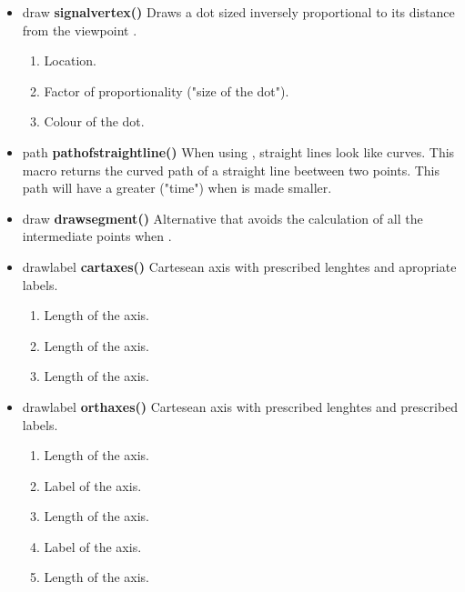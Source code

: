 \begin{itemize}
\item draw {\bfseries signalvertex()} Draws a dot
sized inversely proportional to its distance from
the viewpoint .
\begin{enumerate}
\item {} Location.
\item {} Factor of proportionality
("size of the dot").
\item {} Colour of the dot.
\end{enumerate}

\item path {\bfseries pathofstraightline()} When using
, straight lines
look like curves. This macro returns the curved path
of a straight line beetween two points. This path will
have a greater  ("time") when
 is made smaller.
\item draw {\bfseries drawsegment()} Alternative 
 that avoids the
calculation of all the intermediate points when 
.
\item drawlabel {\bfseries cartaxes()}
Cartesean axis with prescribed lenghtes and apropriate labels.
\begin{enumerate}
\item {} Length of the  axis.
\item {} Length of the  axis.
\item {} Length of the  axis.
\end{enumerate}
\item drawlabel {\bfseries orthaxes()}
Cartesean axis with prescribed lenghtes and prescribed labels.
\begin{enumerate}
\item {} Length of the  axis.
\item {} Label of the  axis.
\item {} Length of the  axis.
\item {} Label of the  axis.
\item {} Length of the  axis.

\end{enumerate}
\end{itemize}
